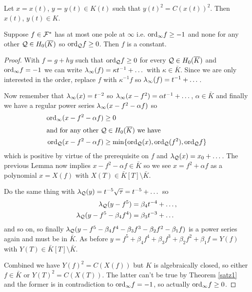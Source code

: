 \documentclass[english,11pt,a4paper]{article}
\begin{document}
\begin{theorem}\label{satz1}
  Let $x = x(t)$, $y = y(t) \in K(t)$ such that $y(t)^2 = C(x(t))^2$. Then $x(t)$, $y(t) \in K$.
\end{theorem}

\begin{lemma}
	Suppose $f \in \mathcal{F}^*$ has at most one pole at $\infty$ i.e. $\text{ord}_{\infty} f \geq -1$ and none for any other $\mathcal{Q} \in H_0(\overline K)$ so $\text{ord}_{\mathcal{Q}} f \geq 0$. Then $f$ is a constant.

	\begin{proof}
		With $f = g+hy$ such that $\text{ord}_{\mathcal{Q}} f \geq 0$ for every $\mathcal{Q} \in H_0(\overline K)$ and $\text{ord}_{\infty} f = -1$ we can write $\lambda_{\infty} (f) = \kappa t^{-1} + \dots$ with $\kappa \in \bar K$. Since we are only interested in the order, replace $f$ with $\kappa^{-1} f$ so $\lambda_{\infty} (f) = t^{-1} + \dots$.

		Now remember that $\lambda_{\infty} (x) = t^{-2}$ so $\lambda_{\infty} (x - f^2) = \alpha t^{-1} + \dots$, $\alpha \in \bar K$ and finally we have a regular power series $\lambda_{\infty} (x - f^2 - \alpha f)$ so
		\begin{align*}
		  \text{ord}_{\infty} (x - f^2 - \alpha f) &\geq 0\\
		\intertext{and for any other $\mathcal{Q} \in H_0(\overline K)$ we have}
		  \text{ord}_{\mathcal{Q}} (x - f^2 - \alpha f) &\geq \min \{ \text{ord}_{\mathcal{Q}} (x) , \text{ord}_{\mathcal{Q}} (f^2) , \text{ord}_{\mathcal{Q}} f \}
		\end{align*}
		which is positive by virtue of the prerequisite on $f$ and $\lambda_{\mathcal{Q}}(x) = x_0 + \dots$. The previous Lemma now implies $x - f^2 - \alpha f \in \bar K$ so we see $x = f^2 + \alpha f$ as a polynomial $x = X(f)$ with $X(T) \in \bar K[T] \setminus \bar K$.

		Do the same thing with $\lambda_{\mathcal{Q}}(y) = t^{-5}\sqrt \tau = t^{-5} + \dots$ so
		\begin{align*}
		  \lambda_{\mathcal{Q}} (y - f^5) &= \beta_4 t^{-4} + \dots,\\
		  \lambda_{\mathcal{Q}} (y - f^5 - \beta_4 f^4) &= \beta_3 t^{-3} + \dots
		\end{align*}
		and so on, so finally $\lambda_{\mathcal{Q}} (y - f^5 - \beta_4 f^4 - \beta_3 f^3 - \beta_2 f^2 - \beta_1 f)$ is a power series again and must be in $\bar K$. As before $y = f^5 + \beta_4 f^4 + \beta_3 f^3 + \beta_2 f^2 + \beta_1 f = Y(f)$ with $Y(T)\in \bar K[T] \setminus \bar K$.

		Combined we have $Y(f)^2 = C(X(f))$ but $K$ is algebraically closed, so either $f \in \bar K$ or $Y(T)^2 = C(X(T))$. The latter can't be true by Theorem \ref{satz1} and the former is in contradiction to $\text{ord}_{\infty} f = -1$, so actually $\text{ord}_{\infty} f \geq 0$.%
	\end{proof}
\end{lemma}
\end{document}
